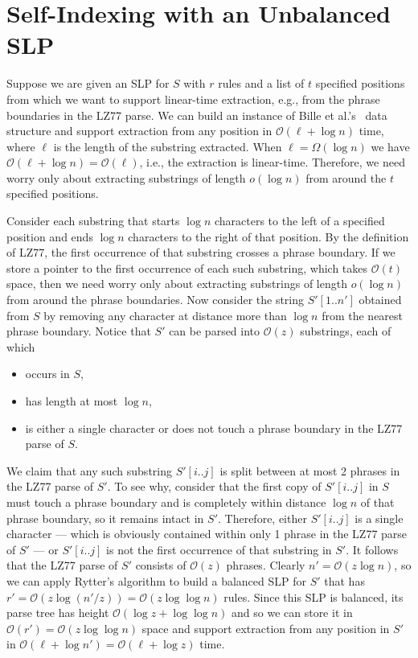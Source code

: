 \documentclass[review]{elsarticle}
\newcommand{\Oh}[1]
    {\ensuremath{\mathcal{O}\!\left( {#1} \right)}}
\begin{document}
\section{Self-Indexing with an Unbalanced SLP} \label{sec:unbalanced}

Suppose we are given an SLP for $S$ with $r$ rules and a list of $t$ specified positions from which we want to support linear-time extraction, e.g., from the phrase boundaries in the LZ77 parse.  We can build an instance of Bille et al.'s~\cite{BLRSSW11} data structure and support extraction from any position in $\Oh{\ell + \log n}$ time, where $\ell$ is the length of the substring extracted.  When \(\ell = \Omega (\log n)\) we have \(\Oh{\ell + \log n} = \Oh{\ell}\), i.e., the extraction is linear-time.  Therefore, we need worry only about extracting substrings of length \(o (\log n)\) from around the $t$ specified positions.

Consider each substring that starts \(\log n\) characters to the left of a specified position and ends \(\log n\) characters to the right of that position.  By the definition of LZ77, the first occurrence of that substring crosses a phrase boundary.  If we store a pointer to the first occurrence of each such substring, which takes $\Oh{t}$ space, then we need worry only about extracting substrings of length \(o (\log n)\) from around the phrase boundaries.  Now consider the string \(S' [1..n']\) obtained from $S$ by removing any character at distance more than \(\log n\) from the nearest phrase boundary.  Notice that $S'$ can be parsed into $\Oh{z}$ substrings, each of which
\begin{itemize}
\item occurs in $S$,
\item has length at most \(\log n\),
\item is either a single character or does not touch a phrase boundary in the LZ77 parse of $S$.
\end{itemize}
We claim that any such substring \(S' [i..j]\) is split between at most 2 phrases in the LZ77 parse of $S'$.  To see why, consider that the first copy of \(S' [i..j]\) in $S$ must touch a phrase boundary and is completely within distance \(\log n\) of that phrase boundary, so it remains intact in $S'$.  Therefore, either \(S' [i..j]\) is a single character --- which is obviously contained within only 1 phrase in the LZ77 parse of $S'$ --- or \(S' [i..j]\) is not the first occurrence of that substring in $S'$.  It follows that the LZ77 parse of $S'$ consists of $\Oh{z}$ phrases.  Clearly \(n' = \Oh{z \log n}\), so we can apply Rytter's algorithm to build a balanced SLP for $S'$ that has \(r' = \Oh{z \log (n' / z)} = \Oh{z \log \log n}\) rules.  Since this SLP is balanced, its parse tree has height $\Oh{\log z + \log \log n}$ and so we can store it in \(\Oh{r'} = \Oh{z \log \log n}\) space and support extraction from any position in $S'$ in \(\Oh{\ell + \log n'} = \Oh{\ell + \log z}\) time.
\end{document}
